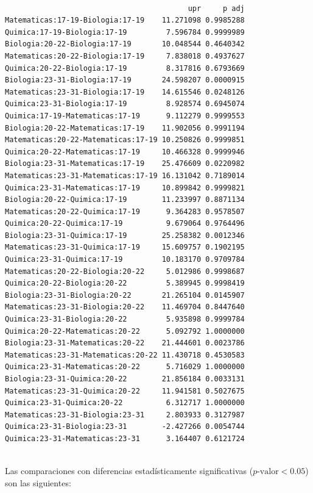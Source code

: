 \documentclass{rapport}
\begin{document}
\begin{itemize}
\begin{verbatim}
                                          
                                          upr     p adj
Matematicas:17-19-Biologia:17-19    11.271098 0.9985288
Quimica:17-19-Biologia:17-19         7.596784 0.9999989
Biologia:20-22-Biologia:17-19       10.048544 0.4640342
Matematicas:20-22-Biologia:17-19     7.838018 0.4937627
Quimica:20-22-Biologia:17-19         8.317816 0.6793669
Biologia:23-31-Biologia:17-19       24.598207 0.0000915
Matematicas:23-31-Biologia:17-19    14.615546 0.0248126
Quimica:23-31-Biologia:17-19         8.928574 0.6945074
Quimica:17-19-Matematicas:17-19      9.112279 0.9999553
Biologia:20-22-Matematicas:17-19    11.902056 0.9991194
Matematicas:20-22-Matematicas:17-19 10.250826 0.9999851
Quimica:20-22-Matematicas:17-19     10.466328 0.9999946
Biologia:23-31-Matematicas:17-19    25.476609 0.0220982
Matematicas:23-31-Matematicas:17-19 16.131042 0.7189014
Quimica:23-31-Matematicas:17-19     10.899842 0.9999821
Biologia:20-22-Quimica:17-19        11.233997 0.8871134
Matematicas:20-22-Quimica:17-19      9.364283 0.9578507
Quimica:20-22-Quimica:17-19          9.679064 0.9764496
Biologia:23-31-Quimica:17-19        25.258382 0.0012346
Matematicas:23-31-Quimica:17-19     15.609757 0.1902195
Quimica:23-31-Quimica:17-19         10.183170 0.9709784
Matematicas:20-22-Biologia:20-22     5.012986 0.9998687
Quimica:20-22-Biologia:20-22         5.389945 0.9998419
Biologia:23-31-Biologia:20-22       21.265104 0.0145907
Matematicas:23-31-Biologia:20-22    11.469704 0.8447640
Quimica:23-31-Biologia:20-22         5.935898 0.9999784
Quimica:20-22-Matematicas:20-22      5.092792 1.0000000
Biologia:23-31-Matematicas:20-22    21.444601 0.0023786
Matematicas:23-31-Matematicas:20-22 11.430718 0.4530583
Quimica:23-31-Matematicas:20-22      5.716029 1.0000000
Biologia:23-31-Quimica:20-22        21.856184 0.0033131
Matematicas:23-31-Quimica:20-22     11.941581 0.5027675
Quimica:23-31-Quimica:20-22          6.312717 1.0000000
Matematicas:23-31-Biologia:23-31     2.803933 0.3127987
Quimica:23-31-Biologia:23-31        -2.427266 0.0054744
Quimica:23-31-Matematicas:23-31      3.164407 0.6121724
   
    \end{verbatim}

Las comparaciones con diferencias estadísticamente significativas (\(p\text{-valor} < 0.05\)) son las siguientes:


\end{itemize}
\end{document}
